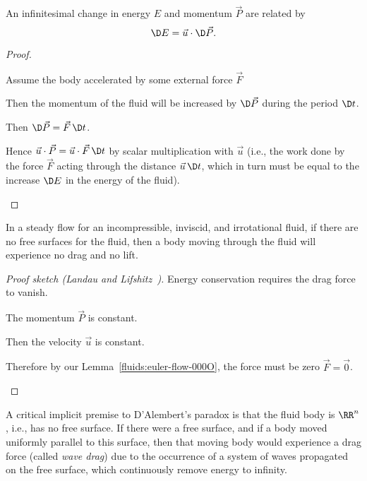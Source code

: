 \begin{node}\label{fluids:euler-flow-000N}%

\begin{lemma}\label{fluids:euler-flow-000O}%
An infinitesimal change in energy $E$ and momentum $\vec{P}$
are related by
\begin{equation*}
\D E=\vec{u}\cdot\D\vec{P}.
\end{equation*}
\end{lemma}%
%
\begin{proof}%
\begin{pf}
\item Assume the body accelerated by some external force $\vec{F}$
\item Then the momentum of the fluid will be increased by $\D\vec{P}$
  during the period $\D t$.
\item Then $\D\vec{P}=\vec{F}\,\D t$.
\item Hence $\vec{u}\cdot\vec{P}=\vec{u}\cdot\vec{F}\,\D t$ by scalar
  multiplication with $\vec{u}$ (i.e., the work done by the force
  $\vec{F}$ acting through the distance $\vec{u}\,\D t$, which in turn
  must be equal to the increase $\D E$ in the energy of the fluid).\qedhere
\end{pf}
\end{proof}

\begin{theorem}\label{fluids:euler-flow-000P}%
In a steady flow for an incompressible, inviscid, and irrotational fluid,
if there are no free surfaces for the fluid, then a body moving through
the fluid will experience no drag and no lift.
\end{theorem}

\begin{proof}[{Proof sketch (Landau and Lifshitz~\cite{landau1987fluids})}] Energy conservation requires the drag force to
  vanish.
\begin{pf}
\item The momentum $\vec{P}$ is constant.
\item Then the velocity $\vec{u}$ is constant.
\item Therefore by our Lemma~\ref{fluids:euler-flow-000O}, the force
  must be zero $\vec{F}=\vec{0}$.\qedhere
\end{pf}
\end{proof}

\begin{node}[Caveats]\label{fluids:euler-flow-000R}%
A critical implicit premise to D'Alembert's paradox is that the fluid
body is $\RR^{n}$, i.e., has no free surface. If there were a free
surface, and if a body moved uniformly parallel to this surface, then
that moving body would experience a drag force (called \emph{wave drag})
due to the occurrence of a system of waves propagated on the free
surface, which continuously remove energy to infinity.
\end{node} %


\end{node}
